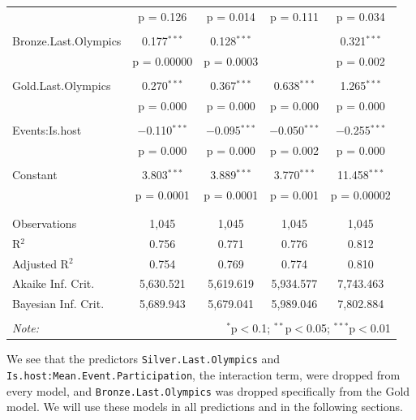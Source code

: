 \documentclass{mcmthesis}
\begin{document}
\begin{table}[!htbp]
\begin{tabular}{@{\extracolsep{5pt}}lcccc}
  & p = 0.126 & p = 0.014 & p = 0.111 & p = 0.034 \\ 
  & & & & \\ 
 Bronze.Last.Olympics & 0.177$^{***}$ & 0.128$^{***}$ &  & 0.321$^{***}$ \\ 
  & p = 0.00000 & p = 0.0003 &  & p = 0.002 \\ 
  & & & & \\ 
 Gold.Last.Olympics & 0.270$^{***}$ & 0.367$^{***}$ & 0.638$^{***}$ & 1.265$^{***}$ \\ 
  & p = 0.000 & p = 0.000 & p = 0.000 & p = 0.000 \\ 
  & & & & \\ 
 Events:Is.host & $-$0.110$^{***}$ & $-$0.095$^{***}$ & $-$0.050$^{***}$ & $-$0.255$^{***}$ \\ 
  & p = 0.000 & p = 0.000 & p = 0.002 & p = 0.000 \\ 
  & & & & \\ 
 Constant & 3.803$^{***}$ & 3.889$^{***}$ & 3.770$^{***}$ & 11.458$^{***}$ \\ 
  & p = 0.0001 & p = 0.0001 & p = 0.001 & p = 0.00002 \\ 
  & & & & \\ 
\hline \\[-1.8ex] 
Observations & 1,045 & 1,045 & 1,045 & 1,045 \\ 
R$^{2}$ & 0.756 & 0.771 & 0.776 & 0.812 \\ 
Adjusted R$^{2}$ & 0.754 & 0.769 & 0.774 & 0.810 \\ 
Akaike Inf. Crit. & 5,630.521 & 5,619.619 & 5,934.577 & 7,743.463 \\ 
Bayesian Inf. Crit. & 5,689.943 & 5,679.041 & 5,989.046 & 7,802.884 \\ 
\hline 
\hline \\[-1.8ex] 
\textit{Note:}  & \multicolumn{4}{r}{$^{*}$p$<$0.1; $^{**}$p$<$0.05; $^{***}$p$<$0.01} \\ 
\end{tabular} 
\end{table} 

We see that the predictors \texttt{Silver.Last.Olympics} and \\ \texttt{Is.host:Mean.Event.Participation}, the interaction term, were dropped from every model, and \texttt{Bronze.Last.Olympics} was dropped specifically from the Gold model. We will use these models in all predictions and in the following sections.
\end{document}
